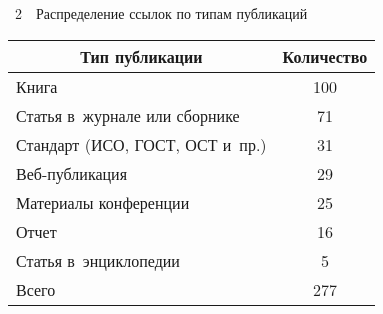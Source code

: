 \begin{multicols}{2}
\noindent
  \begin{center}
  {{\tablename~2}\ \ \small{Распределение ссылок по типам публикаций}}
  \vspace*{2.3ex}

 {\small %
 \tabcolsep=8.2pt
  \begin{tabular}{|l|c|}
  \hline
\multicolumn{1}{|c|}{Тип публикации}&Количество\\
\hline
Книга&100\hphantom{9}\\
Статья в~журнале или сборнике&71\\
Стандарт (ИСО, ГОСТ, ОСТ и~пр.)&31\\
Веб-публикация&29\\
Материалы конференции&25\\
Отчет&16\\
Статья в~энциклопедии&\hphantom{9}5\\
\hline
Всего&277\hphantom{9}\\
\hline
\end{tabular}
}
\end{center}

\vspace*{12pt}




\end{multicols}
